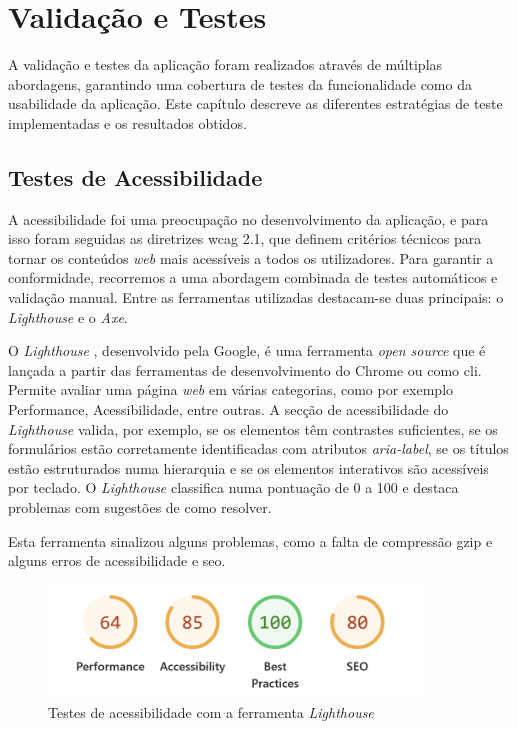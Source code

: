 \chapter{Validação e Testes}
\label{ch:validacaoTestes}

A validação e testes da aplicação foram realizados através de múltiplas abordagens, garantindo uma cobertura de testes  da funcionalidade como da usabilidade da aplicação. Este capítulo descreve as diferentes estratégias de teste implementadas e os resultados obtidos.

\section{Testes de Acessibilidade}

A acessibilidade foi uma preocupação no desenvolvimento da aplicação, e para isso foram seguidas as diretrizes \gls{wcag} 2.1\cite{wcag21}, que definem critérios técnicos para tornar os conteúdos  \textit{web} mais acessíveis a todos os utilizadores. Para garantir a conformidade, recorremos a uma abordagem combinada de testes automáticos e validação manual. Entre as ferramentas utilizadas destacam-se duas principais: o \textit{Lighthouse} e o \textit{Axe}.

O \textit{Lighthouse} \cite{lighthouse}, desenvolvido pela Google, é uma ferramenta \textit{open source} que é lançada a partir das ferramentas de desenvolvimento do Chrome ou como \gls{cli}. Permite avaliar uma página \textit{web} em várias categorias, como por exemplo Performance, Acessibilidade, entre outras. A secção de acessibilidade do \textit{Lighthouse} valida, por exemplo, se os elementos têm contrastes suficientes, se os formulários estão corretamente identificadas com atributos \textit{aria-label}, se os títulos estão estruturados numa hierarquia e se os elementos interativos são acessíveis por teclado. O \textit{Lighthouse} classifica numa pontuação de 0 a 100 e destaca problemas com sugestões de como resolver.

Esta ferramenta sinalizou alguns problemas, como a falta de compressão \gls{gzip} e alguns erros de acessibilidade e \gls{seo}.

\begin{figure}[H]
\centering
\includegraphics[max width=10cm]{./img/lh_before}
\caption{Testes de acessibilidade com a ferramenta \textit{Lighthouse}}
\end{figure}

